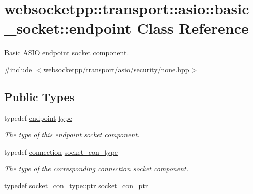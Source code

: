 \hypertarget{classwebsocketpp_1_1transport_1_1asio_1_1basic__socket_1_1endpoint}{}\section{websocketpp\+:\+:transport\+:\+:asio\+:\+:basic\+\_\+socket\+:\+:endpoint Class Reference}
\label{classwebsocketpp_1_1transport_1_1asio_1_1basic__socket_1_1endpoint}


Basic A\+S\+I\+O endpoint socket component.  




{\ttfamily \#include $<$websocketpp/transport/asio/security/none.\+hpp$>$}

\subsection*{Public Types}
\begin{DoxyCompactItemize}
\item 
typedef \hyperlink{classwebsocketpp_1_1transport_1_1asio_1_1basic__socket_1_1endpoint}{endpoint} \hyperlink{classwebsocketpp_1_1transport_1_1asio_1_1basic__socket_1_1endpoint_a3ea3161679492f865e277195915db6ba}{type}
\begin{DoxyCompactList}\small\item\em The type of this endpoint socket component. \end{DoxyCompactList}\item 
typedef \hyperlink{classwebsocketpp_1_1transport_1_1asio_1_1basic__socket_1_1connection}{connection} \hyperlink{classwebsocketpp_1_1transport_1_1asio_1_1basic__socket_1_1endpoint_adbc0e16b7e4aa0ba76ef46378d0c9e5f}{socket\+\_\+con\+\_\+type}
\begin{DoxyCompactList}\small\item\em The type of the corresponding connection socket component. \end{DoxyCompactList}\item 
typedef \hyperlink{classwebsocketpp_1_1transport_1_1asio_1_1basic__socket_1_1connection_a1a4fa6887235c53c7ddd13307798b280}{socket\+\_\+con\+\_\+type\+::ptr} \hyperlink{classwebsocketpp_1_1transport_1_1asio_1_1basic__socket_1_1endpoint_afe9d86dd3fe9e8c73087f22daafcd70c}{socket\+\_\+con\+\_\+ptr}
\end{DoxyCompactItemize}
